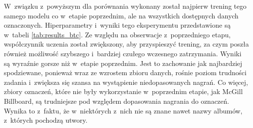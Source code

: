W~związku z~powyższym dla porównania wykonany został najpierw trening tego samego modelu co w~etapie poprzednim, ale na wszystkich dostępnych danych oznaczonych. Hiperparametry i~wyniki tego eksperymentu przedstawione są w~tabeli \ref{tab:results_btc}. Ze względu na obserwacje z~poprzedniego etapu, współczynnik uczenia został zwiększony, aby przyspieszyć trening, za czym poszła również możliwość szybszego i~bardziej czułego wczesnego zatrzymania. Wyniki są wyraźnie gorsze niż w~etapie poprzednim. Jest to zachowanie jak najbardziej spodziewane, ponieważ wraz ze wzrostem zbioru danych, rośnie poziom trudności zadania i~zwiększa się szansa na wystąpienie niedopasowanych nagrań. Co więcej, zbiory oznaczeń, które nie były wykorzystanie w~poprzednim etapie, jak McGill Billboard, są trudniejsze pod względem dopasowania nagrania do oznaczeń. Wynika to z~faktu, że w~niektórych z~nich nie są znane nawet nazwy albumów, z~których pochodzą utwory.

